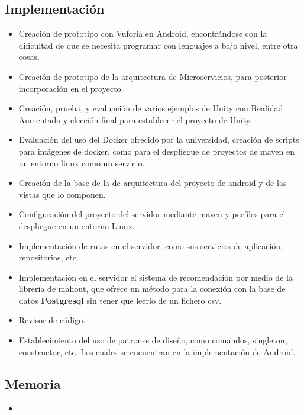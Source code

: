     \subsection{Implementación}
    \label{makereference7.4.3}
        \begin{itemize}  
            \item Creación de prototipo con Vuforia en Android, encontrándose con la dificultad de que se necesita programar con lenguajes a bajo nivel, entre otra cosas.
            \item Creación de prototipo de la arquitectura de Microservicios, para posterior incorporación en el proyecto.
            \item Creación, prueba, y evaluación de varios ejemplos de Unity con Realidad Aumentada y elección final para establecer el proyecto de Unity.
            \item Evaluación del uso del Docker ofrecido por la universidad, creación de scripts para imágenes de docker, como para el despliegue de proyectos de maven en un entorno linux como un servicio. 
            \item Creación de la base de la de arquitectura del proyecto de android y de las vistas que lo componen.
            \item Configuración del proyecto del servidor mediante maven y perfiles para el despliegue en un entorno Linux.
            \item Implementación de rutas en el servidor, como sus servicios de aplicación, repositorios, etc.
            \item Implementación en el servidor el sistema de recomendación por medio de la librería de mahout, que ofrece un método para la conexión con la base de datos \textbf{Postgresql} sin tener que leerlo de un fichero csv.
            \item Revisor de código.
            \item Establecimiento del uso de patrones de diseño, como comandos, singleton, constructor, etc. Los cuales se encuentran en la implementación de Android. 
        \end{itemize}
    \subsection{Memoria}
    \label{makereference7.4.3}
        \begin{itemize}
            \item
        \end{itemize}
